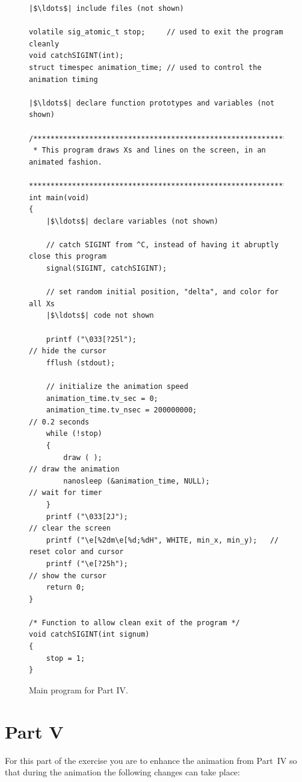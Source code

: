 \documentclass[epsfig,10pt,fullpage]{article}
\begin{document}
\lstset{language=C,numbers=none,escapechar=|}
\begin{figure}[!h]
\begin{center}
\begin{minipage}[t]{15.5 cm}
\begin{lstlisting}[name=main]
|$\ldots$| include files (not shown)

volatile sig_atomic_t stop; 	// used to exit the program cleanly
void catchSIGINT(int);
struct timespec animation_time;	// used to control the animation timing

|$\ldots$| declare function prototypes and variables (not shown)

/*******************************************************************************
 * This program draws Xs and lines on the screen, in an animated fashion.
 ******************************************************************************/
int main(void)
{
	|$\ldots$| declare variables (not shown)

  	// catch SIGINT from ^C, instead of having it abruptly close this program
  	signal(SIGINT, catchSIGINT);

  	// set random initial position, "delta", and color for all Xs
	|$\ldots$| code not shown

  	printf ("\033[?25l");            						// hide the cursor
  	fflush (stdout);

  	// initialize the animation speed
  	animation_time.tv_sec = 0;
  	animation_time.tv_nsec = 200000000;						// 0.2 seconds
  	while (!stop)
  	{
		draw ( );													// draw the animation
		nanosleep (&animation_time, NULL);					// wait for timer
	}
  	printf ("\033[2J"); 											// clear the screen
  	printf ("\e[%2dm\e[%d;%dH", WHITE, min_x, min_y);	// reset color and cursor
  	printf ("\e[?25h");             							// show the cursor
  	return 0;
}

/* Function to allow clean exit of the program */
void catchSIGINT(int signum)
{
  	stop = 1;
}
\end{lstlisting}
\end{minipage}
\caption{Main program for Part IV.}
\label{fig:main}
\end{center}
\end{figure}

\noindent
\section*{Part V}

\noindent
For this part of the exercise you are to enhance the animation from Part~IV so that
during the animation the following changes can take place:
\end{document}
